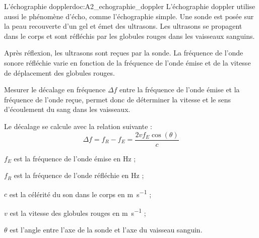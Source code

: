 \begin{doc}{L'échographie doppler}{doc:A2_echographie_doppler}
  L'échographie doppler utilise aussi le phénomène d'écho, comme l'échographie simple.
  Une sonde est posée sur la peau recouverte d'un gel et émet des ultrasons.
  Les ultrasons se propagent dans le corps et sont réfléchis par les globules rouges dans les vaisseaux sanguins.

  Après réflexion, les ultrasons sont reçues par la sonde.
  La fréquence de l'onde sonore réfléchie varie en fonction de la fréquence de l'onde émise et de la vitesse de déplacement des globules rouges.

  \begin{center}
  \end{center}

  Mesurer le décalage en fréquence $\Delta f$ entre la fréquence de l'onde émise et la fréquence de l'onde reçue, permet donc de déterminer la vitesse et le sens d'écoulement du sang dans les vaisseaux.

  \begin{encart}
    Le décalage se calcule avec la relation suivante :
    \begin{equation*}
      \Delta f = f_R - f_E = \dfrac{2vf_E \cos(\theta)}{c}
    \end{equation*}
  \end{encart}
  \begin{multicols}{2}
    \begin{listePoints}
      \item $f_E$ est la fréquence de l'onde émise en \unit{\hertz} ;
      \item $f_R$ est la fréquence de l'onde réfléchie en \unit{\hertz} ;
      \item $c$ est la célérité du son dans le corps en \unit{\m\per\s} ;
      \item $v$ est la vitesse des globules rouges en \unit{\m\per\s} ;
      \item $\theta$ est l'angle entre l'axe de la sonde et l'axe du vaisseau sanguin.
    \end{listePoints}
  \end{multicols}
\end{doc}




